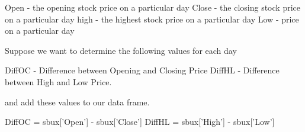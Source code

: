 




Open - the opening stock price on a particular day
Close - the closing stock price on a particular day
high - the highest stock price on a particular day
Low - price on a particular day

Suppose we want to determine the following values for each day

DiffOC - Difference between Opening and Closing Price
DiffHL - Difference between High and Low Price.

and add these values to our data frame.


DiffOC = sbux['Open'] - sbux['Close']
DiffHL = sbux['High'] - sbux['Low']









